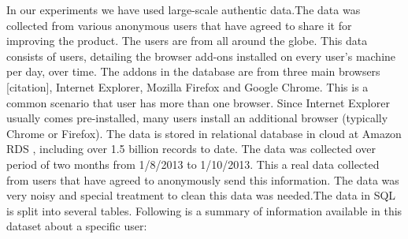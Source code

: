 \documentclass[11pt,oneside]{book}
\begin{document}
In our experiments we have used large-scale authentic data.The data was collected from various anonymous users that have agreed to share it for improving the product. The users are from all around the globe. This data consists of users, detailing the browser add-ons installed on every user's machine per day, over time. The addons in the database are from three main browsers [citation], Internet Explorer, Mozilla Firefox and Google Chrome. This is a common scenario that user has more than one browser. Since Internet Explorer usually comes pre-installed, many users install an additional browser (typically Chrome or Firefox). The data is stored in relational database in cloud at Amazon RDS , including over 1.5 billion records to date. The data was collected over period of two months from  1/8/2013 to 1/10/2013. This a real data collected from users that have agreed to anonymously send this information. The data was very noisy and special treatment to clean this data was needed.The data in SQL is split into several tables.
Following is a summary of information available in this dataset about a specific user:
\end{document}
